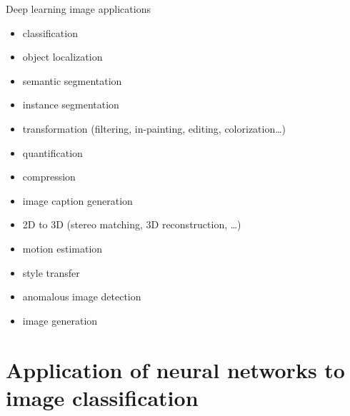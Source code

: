 \documentclass[handout,xcolor=pdftex,dvipsnames,table,mathserif]{beamer}
\begin{document}
\begin{frame}{Deep learning image applications}

  \begin{itemize}
  \item classification
  \item object localization
  \item semantic segmentation
  \item instance segmentation
  \item transformation (filtering, in-painting, editing, colorization…)
  \item quantification
  \item compression
  \item image caption generation
  \item 2D to 3D (stereo matching, 3D reconstruction, …)
  \item motion estimation
  \item style transfer
  \item anomalous image detection
  \item image generation
  \end{itemize}


\end{frame}





\section{Application of neural networks to image classification}
\end{document}

